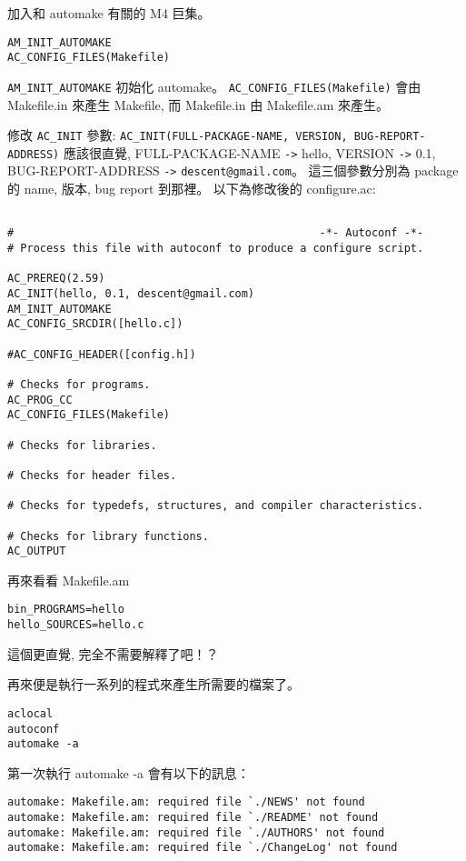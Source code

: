 \documentclass[12pt,a4]{article}
\begin{document}
\begin{CJK}{UTF8}{bsmi}
加入和 automake 有關的 M4 巨集。
\begin{verbatim}
AM_INIT_AUTOMAKE
AC_CONFIG_FILES(Makefile)
\end{verbatim}

\verb+AM_INIT_AUTOMAKE+ 初始化 automake。
\verb+AC_CONFIG_FILES(Makefile)+ 會由 Makefile.in 來產生 Makefile,
而 Makefile.in 由 Makefile.am 來產生。


修改 \verb+AC_INIT+ 參數:
\verb+AC_INIT(FULL-PACKAGE-NAME, VERSION, BUG-REPORT-ADDRESS)+
應該很直覺, FULL-PACKAGE-NAME \verb+->+ hello,
VERSION \verb+->+ 0.1,
BUG-REPORT-ADDRESS \verb+->+ \verb+descent@gmail.com+。
這三個參數分別為 package 的 name, 版本, bug report 到那裡。
以下為修改後的 configure.ac:
\begin{verbatim}

#                                               -*- Autoconf -*-
# Process this file with autoconf to produce a configure script.

AC_PREREQ(2.59)
AC_INIT(hello, 0.1, descent@gmail.com)
AM_INIT_AUTOMAKE
AC_CONFIG_SRCDIR([hello.c])

#AC_CONFIG_HEADER([config.h])

# Checks for programs.
AC_PROG_CC
AC_CONFIG_FILES(Makefile)

# Checks for libraries.

# Checks for header files.

# Checks for typedefs, structures, and compiler characteristics.

# Checks for library functions.
AC_OUTPUT
\end{verbatim}

再來看看 Makefile.am

\begin{verbatim}
bin_PROGRAMS=hello
hello_SOURCES=hello.c
\end{verbatim}

這個更直覺, 完全不需要解釋了吧！？

再來便是執行一系列的程式來產生所需要的檔案了。

\begin{verbatim}
aclocal
autoconf
automake -a
\end{verbatim}

第一次執行 automake -a 會有以下的訊息：
\begin{verbatim}
automake: Makefile.am: required file `./NEWS' not found
automake: Makefile.am: required file `./README' not found
automake: Makefile.am: required file `./AUTHORS' not found
automake: Makefile.am: required file `./ChangeLog' not found
\end{verbatim}


\end{CJK}
\end{document}
